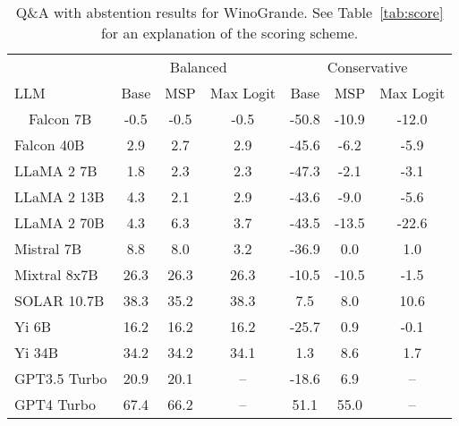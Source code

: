 \begin{table*}[h]
\centering
\caption{Q\&A with abstention results for WinoGrande. See Table~\ref{tab:score} for an explanation of the scoring scheme.}
\label{tab:winogrande_score}
\begin{tabular}{lcccccc}
\toprule
& \multicolumn{3}{c}{Balanced} & \multicolumn{3}{c}{Conservative} \\ 
LLM & Base & MSP & Max Logit & Base & MSP & Max Logit \\ 
\cmidrule(lr){1-1}\cmidrule(lr){2-4}\cmidrule(lr){5-7}\ \ 
Falcon 7B & -0.5 & -0.5 & -0.5 & -50.8 & -10.9 & -12.0\\
Falcon 40B & 2.9 & 2.7 & 2.9 & -45.6 & -6.2 & -5.9\\
LLaMA 2 7B & 1.8 & 2.3 & 2.3 & -47.3 & -2.1 & -3.1\\
LLaMA 2 13B & 4.3 & 2.1 & 2.9 & -43.6 & -9.0 & -5.6\\
LLaMA 2 70B & 4.3 & 6.3 & 3.7 & -43.5 & -13.5 & -22.6\\
Mistral 7B & 8.8 & 8.0 & 3.2 & -36.9 & 0.0 & 1.0\\
Mixtral 8x7B & 26.3 & 26.3 & 26.3 & -10.5 & -10.5 & -1.5\\
SOLAR 10.7B & 38.3 & 35.2 & 38.3 & 7.5 & 8.0 & 10.6\\
Yi 6B & 16.2 & 16.2 & 16.2 & -25.7 & 0.9 & -0.1\\
Yi 34B & 34.2 & 34.2 & 34.1 & 1.3 & 8.6 & 1.7\\
GPT3.5 Turbo & 20.9 & 20.1 & -- & -18.6 & 6.9 & --\\
GPT4 Turbo & 67.4 & 66.2 & -- & 51.1 & 55.0 & --\\
\bottomrule
\end{tabular}
\end{table*}
